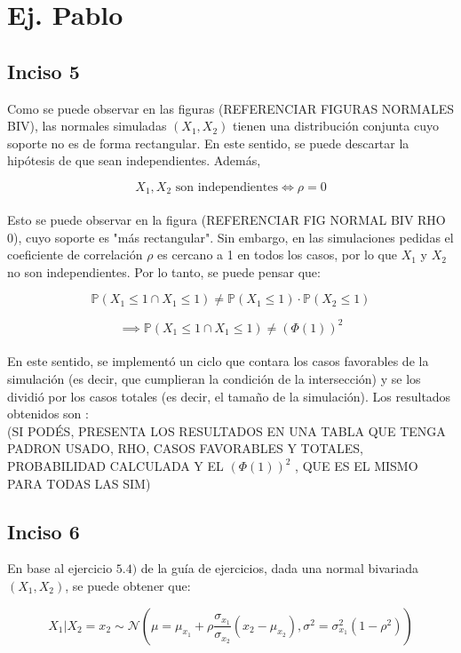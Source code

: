 \documentclass{article}
\begin{document}
\section{Ej. Pablo}

\subsection{Inciso 5}

	Como se puede observar en las figuras (REFERENCIAR FIGURAS NORMALES BIV),  las normales simuladas $(X_1,X_2)$ tienen una distribución conjunta cuyo soporte no es de forma rectangular. En este sentido, se puede descartar la hipótesis de que sean independientes. Además, 

\[X_1 , X_2 \textrm{ son independientes} \iff \rho = 0\]\\

	Esto se puede observar en la figura (REFERENCIAR FIG NORMAL BIV RHO 0), cuyo soporte es "más rectangular". Sin embargo, en las simulaciones pedidas el coeficiente de correlación $\rho$ es cercano a 1 en todos los casos, por lo que $X_1$ y $X_2$ no son independientes. Por lo tanto, se puede pensar que:

\[\mathbb{P}(X_1 \leq 1 \cap X_1 \leq 1) \neq \mathbb{P}(X_1 \leq 1) \cdot \mathbb{P}(X_2 \leq 1)\]

\[\implies \mathbb{P}(X_1 \leq 1 \cap X_1 \leq 1) \neq (\Phi(1))^2\]\\

	En este sentido, se implementó un ciclo que contara los casos favorables de la simulación (es decir, que cumplieran la condición de la intersección) y se los dividió por los casos totales (es decir, el tamaño de la simulación). Los resultados obtenidos son :\\

(SI PODÉS, PRESENTA LOS RESULTADOS EN UNA TABLA QUE TENGA PADRON USADO, RHO, CASOS FAVORABLES Y TOTALES, PROBABILIDAD CALCULADA Y EL $(\Phi(1))^2$ , QUE ES EL MISMO PARA TODAS LAS SIM)

\subsection{Inciso 6}

En base al ejercicio $5.4)$ de la guía de ejercicios, dada una normal bivariada $(X_1,X_2)$, se puede obtener que:

\[X_1|X_2=x_2 \sim \mathcal{N}(\mu=\mu_{x_1}+\rho \frac{\sigma_{x_1}}{\sigma_{x_2}} (x_2 - \mu_{x_2}) , \sigma^2 = \sigma_{x_1}^2 (1- \rho ^2)) \]
\end{document}

